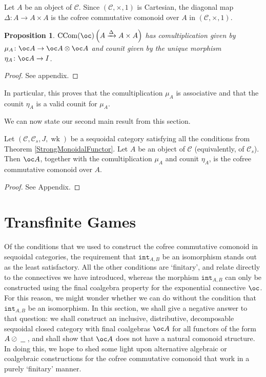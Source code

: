 \documentclass[a4paper,UKenglish]{lipics-v2016}
\theoremstyle{plain}
\newtheorem{proposition}[theorem]{Proposition}
\theoremstyle{definition}
\newcommand*\from{\colon}
\newcommand{\tensor}{\otimes}
\newcommand{\sequoid}{\oslash}
\newcommand{\C}{\mathcal C}
\newcommand{\blank}{\;\underline{\hspace{1.5ex}}\;}
\DeclareMathOperator{\wk}{wk}
\renewcommand{\int}{{\mathtt{int}}}
\DeclareMathOperator{\CCom}{CCom}
\newlength{\arrow}
\begin{document}
Let $A$ be an object of $\C$.  Since $(\C, \times, 1)$ is Cartesian, the diagonal map $\Delta\from A\to A\times A$ is the cofree commutative comonoid over $A$ in $(\C,\times,1)$.  

\begin{proposition}\label{itsMu}
  $\CCom(\oc)\left(A\xrightarrow{\Delta}A\times A\right)$ has comultiplication given by $\mu_A\from\oc A \to \oc A\tensor\oc A$ and counit given by the unique morphism $\eta_A\from \oc A \to I$.
\end{proposition}
\begin{proof}
  See appendix.
\end{proof}

In particular, this proves that the comultiplication $\mu_A$ is associative and that the counit $\eta_A$ is a valid counit for $\mu_A$.

We can now state our second main result from this section.

\begin{theorem}
  \label{Coalgebra__CoCoCo}
  Let $(\C,\C_s,J,\wk)$ be a sequoidal category satisfying all the conditions from Theorem \ref{StrongMonoidalFunctor}.  Let $A$ be an object of $\C$ (equivalently, of $\C_s$).  Then $\oc A$, together with the comultiplication $\mu_A$ and counit $\eta_A$, is the cofree commutative comonoid over $A$.
\end{theorem}

\begin{proof}
  See Appendix.
\end{proof}

\section{Transfinite Games}

Of the conditions that we used to construct the cofree commutative comonoid in sequoidal categories, the requirement that $\int_{A,B}$ be an isomorphism stands out as the least satisfactory.  All the other conditions are `finitary', and relate directly to the connectives we have introduced, whereas the morphism $\int_{A,B}$ can only be constructed using the final coalgebra property for the exponential connective $\oc$.  For this reason, we might wonder whether we can do without the condition that $\int_{A,B}$ be an isomorphism.  In this section, we shall give a negative answer to that question: we shall construct an inclusive, distributive, decomposable sequoidal closed category with final coalgebras $\oc A$ for all functors of the form $A\sequoid\blank$, and shall show that $\oc A$ does not have a natural comonoid structure.  In doing this, we hope to shed some light upon alternative algebraic or coalgebraic constructions for the cofree commutative comonoid that work in a purely `finitary' manner.
\end{document}
